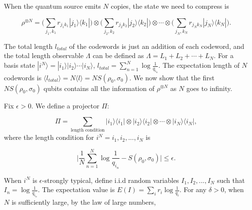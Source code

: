 \documentclass[11pt]{article}
\begin{document}
\begin{comment}
If we consider the precise version, then $\langle l \rangle = \sum_i r_i \big\lceil \log \frac{1}{q_i} \big\rceil$, so just like the classical case, 

\begin{equation}
    S(\rho_0, \sigma_0) \leq \langle l \rangle 
    < S(\rho_0, \sigma_0) + 1.
\end{equation}
\end{comment}


When the quantum source emits $N$ copies, the state we need to compress is

\begin{equation}
    \rho^{\otimes N} 
= \bigg(\sum_{j_1, k_1}
r_{j_1 k_1} |j_1\rangle \langle k_1| \bigg) \otimes
\bigg(\sum_{j_2, k_2}
r_{j_2 k_2} |j_2\rangle \langle k_2| \bigg) \otimes
\cdots \otimes
\bigg(\sum_{j_N, k_N}
r_{j_N k_N} |j_N\rangle \langle k_N| \bigg).
\end{equation}

The total length $l_{total}$ of the codewords is just an addition of each codeword, and the total length observable $\Lambda$ can be defined as $\Lambda = L_1 + L_2 + \cdots + L_N$. For a basis state $|i^N\rangle = |i_1\rangle |i_2\rangle \cdots |i_N\rangle$, $l_{total} = \sum_{n = 1}^N \log \frac{1}{q_{i_n}}$.
The expectation length of $N$ codewords is $\langle l_{total} \rangle = N \langle l \rangle = N S(\rho_0, \sigma_0)$.
We now show that the first $N S(\rho_0, \sigma_0)$ qubits contains all the information of $\rho^{\otimes N}$ as $N$ goes to infinity.

Fix $\epsilon > 0$. We define a projector $\Pi$:

\begin{equation}
    \Pi = \sum_{\text{length condition}}
    |i_1\rangle \langle i_1| \otimes
|i_2\rangle \langle i_2| \otimes \cdots \otimes
|i_N\rangle \langle i_N|,
\end{equation}
where the length condition for $i^N = i_1, i_2, ... ,i_N$ is

\begin{equation}
    \Big|\frac{1}{N}\sum_{n=1}^{N} \log \frac{1}{q_{i_n}} - S(\rho_0, \sigma_0)  \Big| \leq \epsilon. 
\end{equation}

When $i^N$ is $\epsilon$-strongly typical, define i.i.d random variables $I_1, I_2, ... ,I_N$ such that $I_n = \log \frac{1}{q_{i_n}}$. The expectation value is $E(I) = \sum_i r_i \log \frac{1}{q_i}$. For any $\delta > 0$, when $N$ is sufficiently large, by the law of large numbers,
\end{document}
